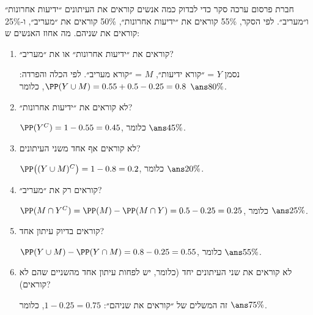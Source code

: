 חברת פרסום ערכה סקר כדי לבדוק כמה אנשים קוראים את העיתונים ״ידיעות אחרונות״ ו״מעריב״. לפי הסקר, 55\% קוראים את ״ידיעות אחרונות״, 50\% קוראים את ״מעריב״, ו-25\% קוראים את שניהם. מה אחוז האנשים ש:
\begin{enumerate}
\item קוראים את ״ידיעות אחרונות״ או את ״מעריב״?
\begin{solbox}
נסמן $Y$ = ״קורא ידיעות״, $M$ = ״קורא מעריב״. לפי הכלה והפרדה: $\PP(Y\cup M)=0.55+0.5-0.25=0.8$, כלומר $\ans{80\%}$.
\end{solbox}
\item לא קוראים את ״ידיעות אחרונות״?
\begin{solbox}
$\PP(Y^C)=1-0.55=0.45$, כלומר $\ans{45\%}$.
\end{solbox}
\item לא קוראים אף אחד משני העיתונים?
\begin{solbox}
$\PP\big((Y\cup M)^C\big)=1-0.8=0.2$, כלומר $\ans{20\%}$.
\end{solbox}
\item קוראים רק את ״מעריב״?
\begin{solbox}
$\PP(M\cap Y^C)=\PP(M)-\PP(M\cap Y)=0.5-0.25=0.25$, כלומר $\ans{25\%}$.
\end{solbox}
\item קוראים בדיוק עיתון אחד?
\begin{solbox}
$\PP(Y\cup M)-\PP(Y\cap M)=0.8-0.25=0.55$, כלומר $\ans{55\%}$.
\end{solbox}
\item לא קוראים את שני העיתונים יחד (כלומר, יש לפחות עיתון אחד מהשניים שהם לא קוראים)?
\begin{solbox}
זה המשלים של ״קוראים את שניהם״: $1-0.25=0.75$, כלומר $\ans{75\%}$.
\end{solbox}
\end{enumerate}
